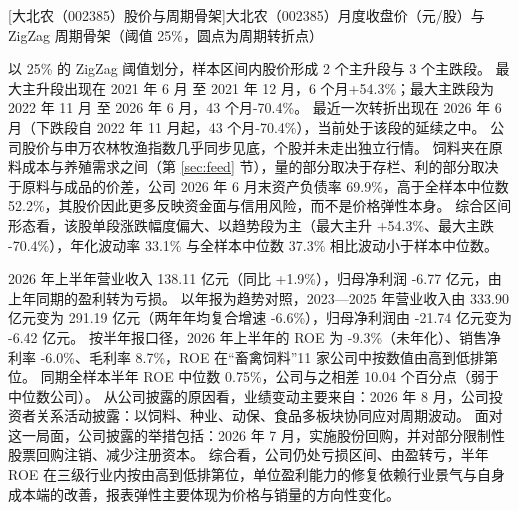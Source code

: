 \begin{center}
\begin{minipage}{\textwidth}\centering
{}

[大北农（002385）股价与周期骨架]{大北农（002385）月度收盘价（元/股）与 ZigZag 周期骨架（阈值 25\%，圆点为周期转折点）}
\end{minipage}
\end{center}

 以 25\% 的 ZigZag 阈值划分，样本区间内股价形成 2 个主升段与 3 个主跌段。 最大主升段出现在 2021 年 6 月 至 2021 年 12 月，6 个月+54.3\%；最大主跌段为 2022 年 11 月 至 2026 年 6 月，43 个月-70.4\%。 最近一次转折出现在 2026 年 6 月（下跌段自 2022 年 11 月起，43 个月-70.4\%），当前处于该段的延续之中。 公司股价与申万农林牧渔指数几乎同步见底，个股并未走出独立行情。 饲料夹在原料成本与养殖需求之间（第 \ref{sec:feed} 节），量的部分取决于存栏、利的部分取决于原料与成品的价差，公司 2026 年 6 月末资产负债率 69.9\%，高于全样本中位数 52.2\%，其股价因此更多反映资金面与信用风险，而不是价格弹性本身。 综合区间形态看，该股单段涨跌幅度偏大、以趋势段为主（最大主升 +54.3\%、最大主跌 -70.4\%），年化波动率 33.1\% 与全样本中位数 37.3\% 相比波动小于样本中位数。

 2026 年上半年营业收入 138.11 亿元（同比 +1.9\%），归母净利润 -6.77 亿元，由上年同期的盈利转为亏损。 以年报为趋势对照，2023---2025 年营业收入由 333.90 亿元变为 291.19 亿元（两年年均复合增速 -6.6\%），归母净利润由 -21.74 亿元变为 -6.42 亿元。 按半年报口径，2026 年上半年的 ROE 为 -9.3\%（未年化）、销售净利率 -6.0\%、毛利率 8.7\%，ROE 在“畜禽饲料”11 家公司中按数值由高到低排第位。 同期全样本半年 ROE 中位数 0.75\%，公司与之相差 10.04 个百分点（弱于中位数公司）。 从公司披露的原因看，业绩变动主要来自：2026 年 8 月，公司投资者关系活动披露：以饲料、种业、动保、食品多板块协同应对周期波动。 面对这一局面，公司披露的举措包括：2026 年 7 月，实施股份回购，并对部分限制性股票回购注销、减少注册资本。 综合看，公司仍处亏损区间、由盈转亏，半年 ROE 在三级行业内按由高到低排第位，单位盈利能力的修复依赖行业景气与自身成本端的改善，报表弹性主要体现为价格与销量的方向性变化。

